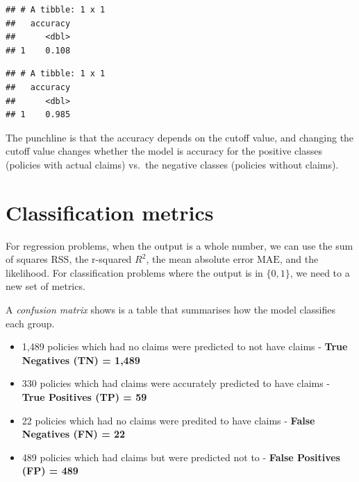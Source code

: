 \documentclass[]{book}
\newenvironment{Shaded}{\begin{snugshade}}{\end{snugshade}}
\newcommand{\DataTypeTok}[1]{\textcolor[rgb]{0.13,0.29,0.53}{#1}}
\newcommand{\DecValTok}[1]{\textcolor[rgb]{0.00,0.00,0.81}{#1}}
\newcommand{\KeywordTok}[1]{\textcolor[rgb]{0.13,0.29,0.53}{\textbf{#1}}}
\newcommand{\NormalTok}[1]{#1}
\newcommand{\OperatorTok}[1]{\textcolor[rgb]{0.81,0.36,0.00}{\textbf{#1}}}
\newcommand{\StringTok}[1]{\textcolor[rgb]{0.31,0.60,0.02}{#1}}
\providecommand{\tightlist}{%
  \setlength{\itemsep}{0pt}\setlength{\parskip}{0pt}}
\begin{document}
\begin{verbatim}
## # A tibble: 1 x 1
##   accuracy
##      <dbl>
## 1    0.108
\end{verbatim}

\begin{Shaded}
\end{Shaded}

\begin{verbatim}
## # A tibble: 1 x 1
##   accuracy
##      <dbl>
## 1    0.985
\end{verbatim}

The punchline is that the accuracy depends on the cutoff value, and changing the cutoff value changes whether the model is accuracy for the positive classes (policies with actual claims) vs.~the negative classes (policies without claims).

\hypertarget{classification-metrics}{%
\section{Classification metrics}\label{classification-metrics}}

For regression problems, when the output is a whole number, we can use the sum of squares \(\text{RSS}\), the r-squared \(R^2\), the mean absolute error \(\text{MAE}\), and the likelihood. For classification problems where the output is in \(\{0,1\}\), we need to a new set of metrics.

A \emph{confusion matrix} shows is a table that summarises how the model classifies each group.

\begin{itemize}
\tightlist
\item
  1,489 policies which had no claims were predicted to not have claims - \textbf{True Negatives (TN) = 1,489}
\item
  330 policies which had claims were accurately predicted to have claims - \textbf{True Positives (TP) = 59}
\item
  22 policies which had no claims were predited to have claims - \textbf{False Negatives (FN) = 22}
\item
  489 policies which had claims but were predicted not to - \textbf{False Positives (FP) = 489}
\end{itemize}
\end{document}
